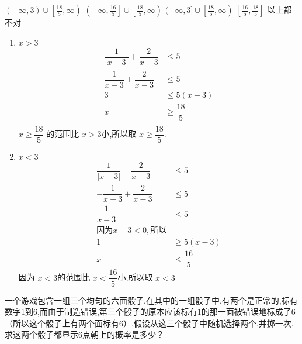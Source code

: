 \documentclass[answers]{exam}
\begin{document}
\begin{questions}
	\begin{oneparchoices}
		\CorrectChoice \( (-\infty, 3) \cup \left[\frac{18}{5}, \infty\right)\)
			\choice \( \left(-\infty, \frac{16}{5}\right] \cup \left[\frac{18}{5}, \infty\right)\)
			\choice \( (-\infty, 3] \cup \left[\frac{18}{5}, \infty\right)\)
		\choice \( \left[ \frac{16}{5}, \frac{18}{5}\right] \)
		\choice 以上都不对
	\end{oneparchoices}

	\begin{solution}
		\begin{enumerate}
			\item \( x > 3 \)
			      \begin{align*}
				      \dfrac{1}{|x-3|} + \dfrac{2}{x-3}   & \le 5             \\
				      \dfrac{1}{x - 3} + \dfrac{2}{x - 3} & \le 5             \\
				      3                                   & \le 5(x-3)        \\
				      x                                   & \ge \dfrac{18}{5} \\
			      \end{align*}
			      \( x \ge \dfrac{18}{5} \) 的范围比 \( x > 3 \)小,所以取 \( x \ge \dfrac{18}{5} \).
			\item \( x < 3 \)
			      \begin{align*}
				      \dfrac{1}{|x-3|} + \dfrac{2}{x-3} & \le 5             \\
				      -\dfrac{1}{x-3} + \dfrac{2}{x-3}  & \le 5             \\
				      \dfrac{1}{x-3}                    & \le 5             \\
				      \text{因为} x - 3 < 0, \text{所以}                   \\
				      1                                 & \ge 5(x - 3)      \\
				      x                                 & \le \dfrac{16}{5}
			      \end{align*}
			      因为 \( x < 3 \)的范围比 \( x < \dfrac{16}{5} \)小,所以取 \( x < 3 \)
		\end{enumerate}
	\end{solution}

	\question 一个游戏包含一组三个均匀的六面骰子.在其中的一组骰子中,有两个是正常的,标有数字1到6,而由于制造错误,第三个骰子的原本应该标有1的那一面被错误地标成了6（所以这个骰子上有两个面标有6）.假设从这三个骰子中随机选择两个,并掷一次.求这两个骰子都显示6点朝上的概率是多少？


\end{questions}
\end{document}

